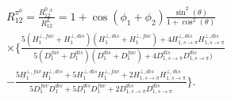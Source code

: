 \documentclass[aps,prX,preprint,groupedaddress,linenumbers]{revtex4-1}
\begin{document}
\begin{multline}
R_{12}^{\pi^0}=\frac{R^{0\pm}_{12}}{R^L_{12}}=1+\cos(\phi_1+\phi_2)\frac{\sin^2(\theta)}{1+\cos^2(\theta)} \\
\times\bigg\{\frac{5(H^{\bot,fav}_1+H^{\bot,dis}_1)(H^{\bot,dis}_1+H^{\bot,fav}_1)+4H^{\bot,dis}_{1,s\rightarrow\pi}H^{\bot,dis}_{1,s\rightarrow\pi}}{5(D^{fav}_1+D^{dis}_1)(D^{dis}_1+D^{fav}_1)+4D^{dis}_{1,s\rightarrow\pi}D^{dis}_{1,s\rightarrow\pi})}\\
-\frac{5H^{\bot,fav}_1H^{\bot,dis}_1+5H^{\bot,dis}_1H^{\bot,fav}_1+2H^{\bot,dis}_{1,s\rightarrow\pi}H^{\bot,dis}_{1,s\rightarrow\pi}}{5D^{fav}_1D^{dis}_1+5D^{dis}_1D^{fav}_1+2D^{dis}_{1,s\rightarrow\pi}D^{dis}_{1,s\rightarrow\pi}} \bigg\}.
\label{eqn:FF5}
\end{multline}




\end{document}
